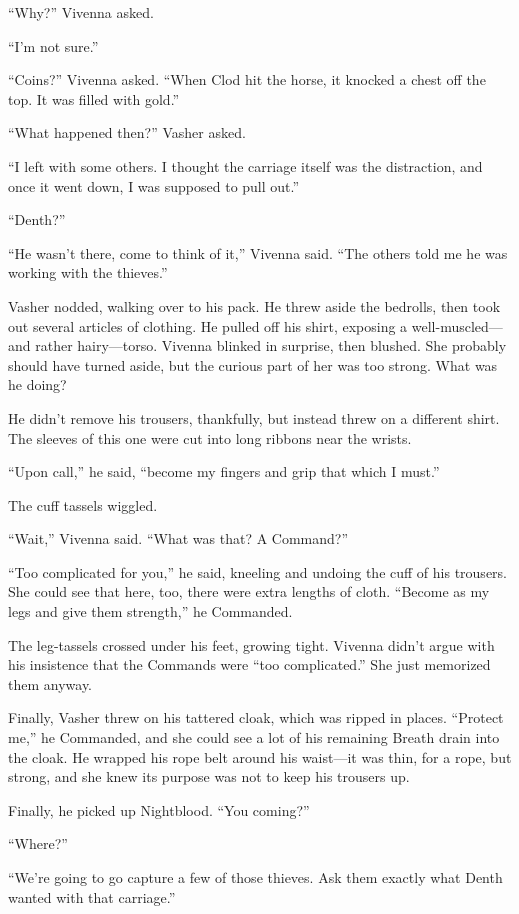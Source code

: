 “Why?” Vivenna asked.

“I’m not sure.”

“Coins?” Vivenna asked. “When Clod hit the horse, it knocked a chest off the top. It was filled with gold.”

“What happened then?” Vasher asked.

“I left with some others. I thought the carriage itself was the distraction, and once it went down, I was supposed to pull out.”

“Denth?”

“He wasn’t there, come to think of it,” Vivenna said. “The others told me he was working with the thieves.”

Vasher nodded, walking over to his pack. He threw aside the bedrolls, then took out several articles of clothing. He pulled off his shirt, exposing a well-muscled—and rather hairy—torso. Vivenna blinked in surprise, then blushed. She probably should have turned aside, but the curious part of her was too strong. What was he doing?

He didn’t remove his trousers, thankfully, but instead threw on a different shirt. The sleeves of this one were cut into long ribbons near the wrists.

“Upon call,” he said, “become my fingers and grip that which I must.”

The cuff tassels wiggled.

“Wait,” Vivenna said. “What was that? A Command?”

“Too complicated for you,” he said, kneeling and undoing the cuff of his trousers. She could see that here, too, there were extra lengths of cloth. “Become as my legs and give them strength,” he Commanded.

The leg-tassels crossed under his feet, growing tight. Vivenna didn’t argue with his insistence that the Commands were “too complicated.” She just memorized them anyway.

Finally, Vasher threw on his tattered cloak, which was ripped in places. “Protect me,” he Commanded, and she could see a lot of his remaining Breath drain into the cloak. He wrapped his rope belt around his waist—it was thin, for a rope, but strong, and she knew its purpose was not to keep his trousers up.

Finally, he picked up Nightblood. “You coming?”

“Where?”

“We’re going to go capture a few of those thieves. Ask them exactly what Denth wanted with that carriage.”


